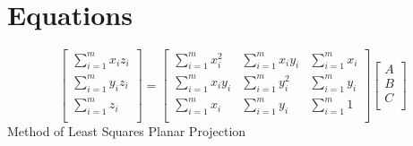 \documentclass[journal,onecolumn]{IEEEtran}
\begin{document}
%


\appendices
\section{Equations}

\begin{equation}\label{eqn:MLS}
	\left[ {\begin{array}{cc}
			\sum_{i=1}^{m} x_i z_i \\
			\sum_{i=1}^{m} y_i z_i \\
			\sum_{i=1}^{m} z_i \\
			
	\end{array} } \right]
	=
	\left[ {\begin{array}{ccc}
			\sum_{i=1}^{m} x_i^2 		& \sum_{i=1}^{m} x_i y_i 		& \sum_{i=1}^{m} x_i \\
			\sum_{i=1}^{m} x_i y_i 		& \sum_{i=1}^{m} y_i^2 			& \sum_{i=1}^{m} y_i \\
			\sum_{i=1}^{m} x_i 			& \sum_{i=1}^{m} y_i 			& \sum_{i=1}^{m} 1   \\
	\end{array} } \right]
	\left[ {\begin{array}{cc}
			A\\
			B\\
			C\\
	\end{array} } \right]
\end{equation}
\centering
{Method of Least Squares Planar Projection}


\end{document}
